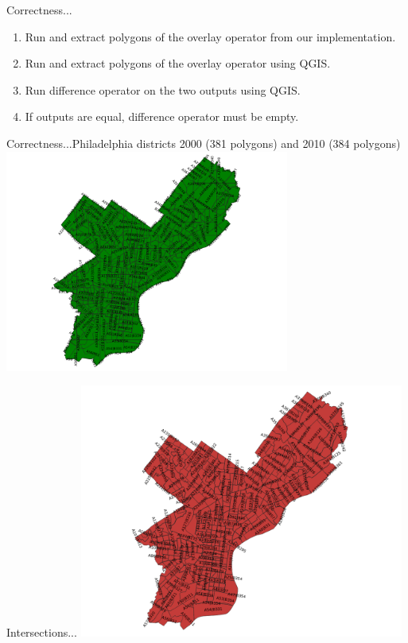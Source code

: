 \documentclass{beamer}
\begin{document}
\begin{frame}{Correctness...}
    \begin{enumerate}
        \item Run and extract polygons of the overlay operator from our implementation.
        \item Run and extract polygons of the overlay operator using QGIS.
        \item Run difference operator on the two outputs using QGIS.
        \item If outputs are equal, difference operator must be empty.
    \end{enumerate}
\end{frame}
\begin{frame}{Correctness...}{Philadelphia districts 2000 (381 polygons) and 2010 (384 polygons)}
    \centering
	\includegraphics[trim=1cm 0 1cm 0, clip, width=0.7\textwidth]{figures/06-Correctness/Phili_Faces}
\end{frame}
\begin{frame}{Intersections...}
    \centering
	\includegraphics[trim=1cm 0 1cm 0, clip, width=0.8\textwidth]{figures/06-Correctness/Phili_Intersections}
\end{frame}
\end{document}
